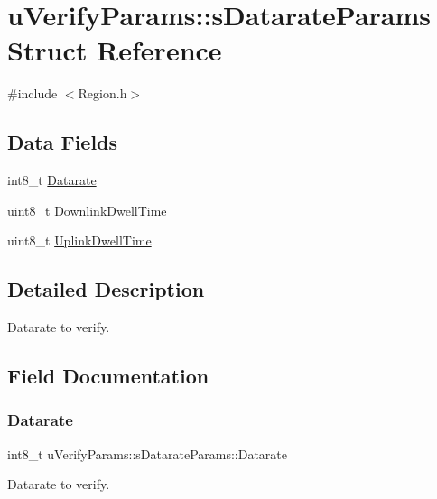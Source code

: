 \hypertarget{structuVerifyParams_1_1sDatarateParams}{}\section{u\+Verify\+Params\+:\+:s\+Datarate\+Params Struct Reference}
\label{structuVerifyParams_1_1sDatarateParams}


{\ttfamily \#include $<$Region.\+h$>$}

\subsection*{Data Fields}
\begin{DoxyCompactItemize}
\item 
int8\+\_\+t \hyperlink{structuVerifyParams_1_1sDatarateParams_ad8ddd1ecfc21d3e9c9e3796a10754673}{Datarate}
\item 
uint8\+\_\+t \hyperlink{structuVerifyParams_1_1sDatarateParams_ae8fd408a4c59e87cf9bda8b0760fb889}{Downlink\+Dwell\+Time}
\item 
uint8\+\_\+t \hyperlink{structuVerifyParams_1_1sDatarateParams_af6e261fe7a0e3117bd0d37084e294ba6}{Uplink\+Dwell\+Time}
\end{DoxyCompactItemize}


\subsection{Detailed Description}
Datarate to verify. 

\subsection{Field Documentation}
\mbox{\label{structuVerifyParams_1_1sDatarateParams_ad8ddd1ecfc21d3e9c9e3796a10754673}} 
\subsubsection{\texorpdfstring{Datarate}{Datarate}}
{\footnotesize\ttfamily int8\+\_\+t u\+Verify\+Params\+::s\+Datarate\+Params\+::\+Datarate}

Datarate to verify. \mbox{\label{structuVerifyParams_1_1sDatarateParams_ae8fd408a4c59e87cf9bda8b0760fb889}} 
